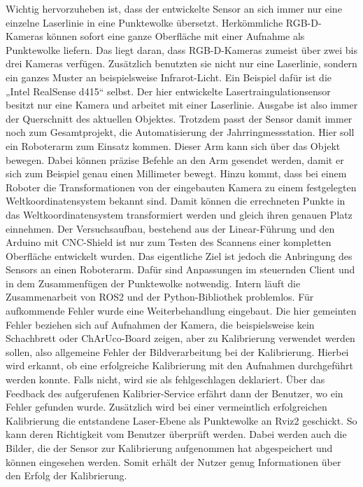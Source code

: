 	Wichtig hervorzuheben ist, dass der entwickelte Sensor an sich immer nur eine einzelne Laserlinie in eine Punktewolke übersetzt. Herkömmliche RGB-D-Kameras können sofort eine ganze Oberfläche mit einer Aufnahme als Punktewolke liefern. Das liegt daran, dass RGB-D-Kameras zumeist über zwei bis drei Kameras verfügen. Zusätzlich benutzten sie nicht nur eine Laserlinie, sondern ein ganzes Muster an beispielsweise Infrarot-Licht. Ein Beispiel dafür ist die „Intel RealSense d415“ selbst. Der hier entwickelte Lasertraingulationsensor besitzt nur eine Kamera und arbeitet mit einer Laserlinie. Ausgabe ist also immer der Querschnitt des aktuellen Objektes. Trotzdem passt der Sensor damit immer noch zum Gesamtprojekt, die Automatisierung der Jahrringmessstation. Hier soll ein Roboterarm zum Einsatz kommen. Dieser Arm kann sich über das Objekt bewegen. Dabei können präzise Befehle an den Arm gesendet werden, damit er sich zum Beispiel genau einen Millimeter bewegt. Hinzu kommt, dass bei einem Roboter die Transformationen von der eingebauten Kamera zu einem festgelegten Weltkoordinatensystem bekannt sind. Damit können die errechneten Punkte in das Weltkoordinatensystem transformiert werden und gleich ihren genauen Platz einnehmen. Der Versuchsaufbau, bestehend aus der Linear-Führung und den Arduino mit CNC-Shield ist nur zum Testen des Scannens einer kompletten Oberfläche entwickelt wurden. Das eigentliche Ziel ist jedoch die Anbringung des Sensors an einen Roboterarm. Dafür sind Anpassungen im steuernden Client und in dem Zusammenfügen der Punktewolke notwendig. \newline
	Intern läuft die Zusammenarbeit von ROS2 und der Python-Bibliothek problemlos. Für aufkommende Fehler wurde eine Weiterbehandlung eingebaut. Die hier gemeinten Fehler beziehen sich auf Aufnahmen der Kamera, die beispielsweise kein Schachbrett oder ChArUco-Board zeigen, aber zu Kalibrierung verwendet werden sollen, also allgemeine Fehler der Bildverarbeitung bei der Kalibrierung. Hierbei wird erkannt, ob eine erfolgreiche Kalibrierung mit den Aufnahmen durchgeführt werden konnte. Falls nicht, wird sie als fehlgeschlagen deklariert. Über das Feedback des aufgerufenen Kalibrier-Service erfährt dann der Benutzer, wo ein Fehler gefunden wurde. Zusätzlich wird bei einer vermeintlich erfolgreichen Kalibrierung die entstandene Laser-Ebene als Punktewolke an Rviz2 geschickt. So kann deren Richtigkeit vom Benutzer überprüft werden. Dabei werden auch die Bilder, die der Sensor zur Kalibrierung aufgenommen hat abgespeichert und können eingesehen werden. Somit erhält der Nutzer genug Informationen über den Erfolg der Kalibrierung. 
